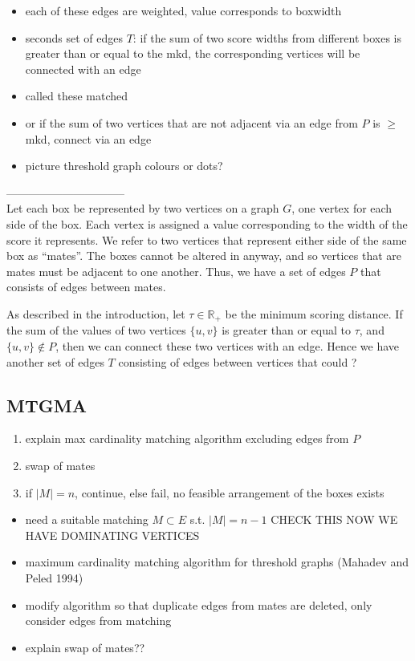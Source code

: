\documentclass{llncs}
\begin{document}
\begin{itemize}
	\item each of these edges are weighted, value corresponds to boxwidth
	\item seconds set of edges $T$: if the sum of two score widths from different boxes is greater than or equal to the mkd, the corresponding vertices will be connected with an edge 
	\item called these matched
	\item or if the sum of two vertices that are not adjacent via an edge from $P$ is $\geq$ mkd, connect via an edge
	\item picture threshold graph colours or dots?	
\end{itemize}


--------------------------------\\
Let each box be represented by two vertices on a graph $G$, one vertex for each side of the box. Each vertex is assigned a value corresponding to the width of the score it represents. We refer to two vertices that represent either side of the same box as ``mates''. The boxes cannot be altered in anyway, and so vertices that are mates must be adjacent to one another. Thus, we have a set of edges $P$ that consists of edges between mates.

As described in the introduction, let $\tau \in \mathbb{R}_{+}$ be the minimum scoring distance. If the sum of the values of two vertices $\{u, v\}$ is greater than or equal to $\tau$, and $\{u,v\} \notin P$, then we can connect these two vertices with an edge. Hence we have another set of edges $T$ consisting of edges between vertices that could ?  

\subsection{MTGMA}
\begin{enumerate}
	\item explain max cardinality matching algorithm excluding edges from $P$
	\item swap of mates
	\item if $|M| = n$, continue, else fail, no feasible arrangement of the boxes exists
\end{enumerate}
\begin{itemize}
	\item need a suitable matching $M\subset E$ s.t. $|M| = n-1$ CHECK THIS NOW WE HAVE DOMINATING VERTICES
	\item maximum cardinality matching algorithm for threshold graphs (Mahadev and Peled 1994)
	\item modify algorithm so that duplicate edges from mates are deleted, only consider edges from matching
	\item explain swap of mates??
\end{itemize}
\end{document}
